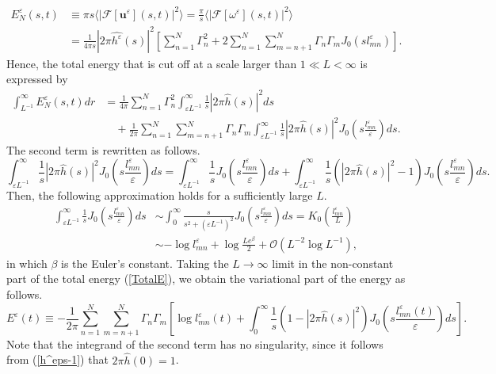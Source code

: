 \documentclass{article}
\theoremstyle{definition}
\begin{document}
\begin{align*}
E_N^\varepsilon(s, t) &\equiv \pi s \langle \left\vert \mathscr{F}[{\bm u}^\varepsilon](s,t) \right\vert^2 \rangle = \frac{\pi}{s} \langle \left\vert \mathscr{F}[\omega^\varepsilon](s,t) \right\vert^2 \rangle  \\
& = \frac{1}{4 \pi s} \left\vert 2\pi\widehat{h^\varepsilon}(s) \right\vert^2 \left[ \sum_{n=1}^N \Gamma_n^2 + 2 \sum_{n=1}^N \sum_{m=n+1}^N \Gamma_n \Gamma_m J_0 \left( s l_{mn}^\varepsilon \right) \right]. 
\end{align*}
Hence, the total energy that is cut off at a scale larger than $1 \ll L < \infty$  is expressed by
\begin{align}
\int_{L^{-1}}^\infty E_N^\varepsilon(s, t) dr &= \frac{1}{4 \pi} \sum_{n=1}^N \Gamma_n^2\int_{\varepsilon L^{-1}}^\infty \frac{1}{s} \left\vert 2\pi\widehat{h}(s) \right\vert^2 ds   \nonumber \\
& \quad +  \frac{1}{2\pi} \sum_{n=1}^N \sum_{m=n+1}^N \Gamma_n \Gamma_m \int_{\varepsilon L^{-1}}^\infty \frac{1}{s} \left\vert 2\pi\widehat{h}(s) \right\vert^2  J_0 \left( s \frac{l_{mn}^\varepsilon}{\varepsilon} \right) ds. \label{TotalE}
\end{align} 
The second term is rewritten as follows.
\[
\int_{\varepsilon L^{-1}}^\infty \frac{1}{s} \left\vert 2\pi\widehat{h}(s) \right\vert^2  J_0 \left( s \frac{l_{mn}^\varepsilon}{\varepsilon} \right) ds = \int_{\varepsilon L^{-1}}^\infty \frac{1}{s} J_0 \left( s \frac{l_{mn}^\varepsilon}{\varepsilon} \right) ds + \int_{\varepsilon L^{-1}}^\infty \frac{1}{s} \left( \left\vert 2\pi\widehat{h}(s) \right\vert^2 - 1 \right) J_0 \left( s \frac{l_{mn}^\varepsilon}{\varepsilon} \right) ds.
\]
Then, the following approximation holds for a sufficiently large $L$.
\begin{align*}
\int_{\varepsilon L^{-1}}^\infty \frac{1}{s} J_0 \left( s \frac{l_{mn}^\varepsilon}{\varepsilon} \right) ds &\sim \int_0^\infty \frac{ s }{s^2 + (\varepsilon L^{-1})^2} J_0 \left( s \frac{l_{mn}^\varepsilon}{\varepsilon}\right)  ds  = K_0\left( \frac{l_{mn}^\varepsilon}{L} \right) \\
& \sim - \log l_{mn}^\varepsilon  + \log{\frac{L e^\beta}{2}} + \mathcal{O}\left( L^{-2} \log{L^{-1}} \right), 
\end{align*}
in which $\beta$ is the Euler's constant. Taking the $L \rightarrow \infty$ limit in the non-constant part of the total energy (\ref{TotalE}), we obtain the variational part of the energy as follows.
\begin{equation}
E^\varepsilon(t) \equiv - \frac{1}{2\pi} \sum_{n=1}^N \sum_{m=n+1}^N \Gamma_n \Gamma_m \left[ \log{l_{mn}^\varepsilon(t)} +  \int_0^\infty \frac{1}{s} \left( 1 - \left\vert 2\pi\widehat{h}(s) \right\vert^2 \right) J_0 \left( s \frac{l_{mn}^\varepsilon(t)}{\varepsilon} \right) ds \right]. \label{v-energy}
\end{equation}
Note that the integrand of the second term has no singularity, since it follows from (\ref{h^eps-1}) that $2\pi \widehat{h}(0) =  1$.
\end{document}
